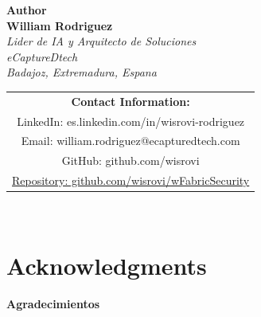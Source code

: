 \documentclass[12pt,a4paper]{report}
\begin{document}
\begin{titlepage}
    \centering
    \vspace*{3cm}
    
    {\color{blue!70!black}\Large\textbf{Author}}\\[1.5cm]
    
    {\Huge\textbf{William Rodriguez}}\\[1cm]
    
    \textit{Lider de IA y Arquitecto de Soluciones}\\[0.3cm]
    \textit{eCaptureDtech}\\[0.2cm]
    \textit{Badajoz, Extremadura, Espana}\\[1.5cm]
    
    \begin{tabular}{c}
        \textbf{Contact Information:}\\[0.8cm]
        LinkedIn: es.linkedin.com/in/wisrovi-rodriguez\\[0.3cm]
        Email: william.rodriguez@ecapturedtech.com\\[0.3cm]
        GitHub: github.com/wisrovi\\[0.3cm]
        \href{https://github.com/wisrovi/wFabricSecurity}{Repository: github.com/wisrovi/wFabricSecurity}\\
    \end{tabular}\\[2cm]
    
    \vfill
\end{titlepage}

\tableofcontents
\cleardoublepage

\listoffigures
\cleardoublepage

\listoftables
\cleardoublepage

\lstlistoflistings
\cleardoublepage

\chapter{Acknowledgments}
\cleardoublepage
{}

\begin{center}
    \Large\textbf{Agradecimientos}\\[1cm]
\end{center}
\end{document}
